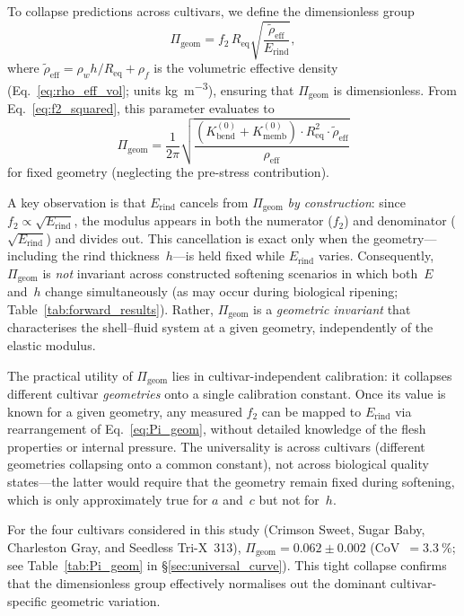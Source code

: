 To collapse predictions across cultivars, we define the dimensionless
group
\begin{equation}
  \Pi_{\mathrm{geom}} = f_2 \, R_{\mathrm{eq}}
    \sqrt{\frac{\tilde{\rho}_{\mathrm{eff}}}{E_{\mathrm{rind}}}},
  \label{eq:Pi_geom}
\end{equation}
where $\tilde{\rho}_{\mathrm{eff}} = \rho_w h / R_{\mathrm{eq}} +
\rho_f$ is the volumetric effective density
(Eq.~\ref{eq:rho_eff_vol}; units \si{\kilogram\per\metre\cubed}),
ensuring that $\Pi_{\mathrm{geom}}$ is dimensionless.
From Eq.~\eqref{eq:f2_squared}, this parameter evaluates to
\begin{equation}
  \Pi_{\mathrm{geom}} = \frac{1}{2\pi}
    \sqrt{\frac{(K_{\mathrm{bend}}^{(0)} + K_{\mathrm{memb}}^{(0)})
    \cdot R_{\mathrm{eq}}^2 \cdot \tilde{\rho}_{\mathrm{eff}}}
    {\rho_{\mathrm{eff}}}}
  \label{eq:Pi_geom_universal}
\end{equation}
for fixed geometry (neglecting the pre-stress contribution).

A key observation is that $E_{\mathrm{rind}}$ cancels from
$\Pi_{\mathrm{geom}}$ \emph{by construction}: since $f_2 \propto
\sqrt{E_{\mathrm{rind}}}$, the modulus appears in both the numerator
($f_2$) and denominator ($\sqrt{E_{\mathrm{rind}}}$) and divides out.
This cancellation is exact only when the geometry---including the rind
thickness~$h$---is held fixed while $E_{\mathrm{rind}}$ varies.
Consequently, $\Pi_{\mathrm{geom}}$ is \emph{not} invariant across
constructed softening scenarios in which both~$E$ and~$h$ change simultaneously
(as may occur during biological ripening;
Table~\ref{tab:forward_results}).
Rather, $\Pi_{\mathrm{geom}}$ is a
\emph{geometric invariant} that characterises the shell--fluid system
at a given geometry, independently of the elastic modulus.

The practical utility of $\Pi_{\mathrm{geom}}$ lies in
cultivar-independent calibration: it collapses different cultivar
\emph{geometries} onto a single calibration constant.  Once its value is
known for a given geometry, any measured $f_2$ can be mapped to
$E_{\mathrm{rind}}$ via rearrangement of Eq.~\eqref{eq:Pi_geom},
without detailed knowledge of the flesh properties or internal pressure.
The universality is across cultivars (different geometries collapsing
onto a common constant), not across biological quality states---the latter would
require that the geometry remain fixed during softening, which is only
approximately true for $a$ and~$c$ but not for~$h$.

For the four cultivars considered in this study (Crimson Sweet, Sugar
Baby, Charleston Gray, and Seedless Tri-X~313),
$\Pi_{\mathrm{geom}} = 0.062 \pm 0.002$ (CoV~$= \SI{3.3}{\percent}$;
see Table~\ref{tab:Pi_geom} in \S\ref{sec:universal_curve}).  This
tight collapse confirms that the dimensionless group effectively
normalises out the dominant cultivar-specific geometric variation.
